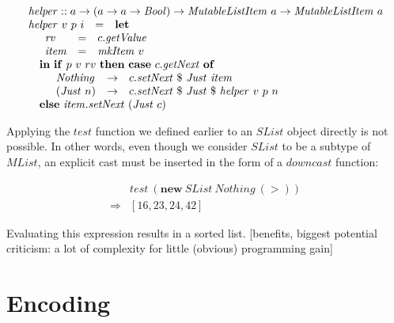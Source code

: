 \documentclass[runningheads,a4paper]{llncs}
\newcommand{\todo}[1]{[{\color{blue}#1}]}
\begin{document}
\begin{displaymath}
\begin{array}{lcl}
\multicolumn{3}{l}{\mathit{helper} :: a \to (a \to a \to \mathit{Bool}) \to \mathit{MutableListItem}~a \to \mathit{MutableListItem}~a} \\
\mathit{helper}~v~p~i & = & \mathbf{let} \\
\multicolumn{3}{l}{\quad \begin{array}{lcl}
\mathit{rv} & = & c.\mathit{getValue} \\
\mathit{item} & = & \mathit{mkItem}~v
\end{array}}\\
\multicolumn{3}{l}{\quad \mathbf{in}~\mathbf{if}~p~v~rv~\mathbf{then}~\mathbf{case}~c.\mathit{getNext}~\mathbf{of}} \\
\multicolumn{3}{l}{\quad \quad \begin{array}{lcl}
\mathit{Nothing} & \to & c.\mathit{setNext}~\$~\mathit{Just}~\mathit{item} \\
(\mathit{Just}~n) & \to & c.\mathit{setNext}~\$~\mathit{Just}~\$~\mathit{helper}~v~p~n 
\end{array}} \\
\multicolumn{3}{l}{\quad \mathbf{else}~\mathit{item}.\mathit{setNext}~(\mathit{Just}~c)}
\end{array}
\end{displaymath}

Applying the $\mathit{test}$ function we defined earlier to an $\mathit{SList}$ object directly is not possible. In other words, even though we consider $\mathit{SList}$ to be a subtype of $\mathit{MList}$, an explicit cast must be inserted in the form of a $\mathit{downcast}$ function:

\begin{displaymath}
\begin{array}{cl}
 & \mathit{test}~(\mathbf{new}~\mathit{SList}~\mathit{Nothing}~(>)) \\
\Rightarrow & [16,23,24,42]
\end{array}
\end{displaymath}   

Evaluating this expression results in a sorted list. \todo{benefits, biggest potential criticism: a lot of complexity for little (obvious) programming gain}

\section{Encoding}
\label{sec:encoding}
\end{document}
